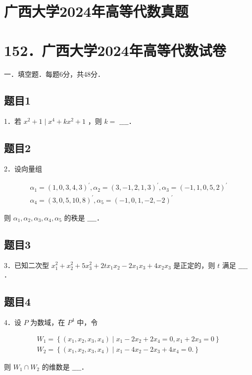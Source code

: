 \documentclass{article}
\begin{document}
\section*{广西大学2024年高等代数真题}
\section*{152．广西大学2024年高等代数试卷}
一．填空题．每题6分，共48分．\\

\subsection{题目1}
1．若 \(x^{2}+1 \mid x^{4}+k x^{2}+1\) ，则 \(k=\) \(\_\_\_\_\)．

\subsection{题目2}
2．设向量组

\[
\begin{gathered}
\alpha_{1}=(1,0,3,4,3)^{\prime}, \alpha_{2}=(3,-1,2,1,3)^{\prime}, \alpha_{3}=(-1,1,0,5,2)^{\prime} \\
\alpha_{4}=(3,0,5,10,8)^{\prime}, \alpha_{5}=(-1,0,1,-2,-2)^{\prime}
\end{gathered}
\]

则 \(\alpha_{1}, \alpha_{2}, \alpha_{3}, \alpha_{4}, \alpha_{5}\) 的秩是 \(\_\_\_\_\)．

\subsection{题目3}
3．已知二次型 \(x_{1}^{2}+x_{2}^{2}+5 x_{3}^{2}+2 t x_{1} x_{2}-2 x_{1} x_{3}+4 x_{2} x_{3}\) 是正定的，则 \(t\) 满足 \(\_\_\_\_\)．

\subsection{题目4}
4．设 \(P\) 为数域，在 \(P^{4}\) 中，令

\[
\begin{gathered}
W_{1}=\left\{\left(x_{1}, x_{2}, x_{3}, x_{4}\right) \mid x_{1}-2 x_{2}+2 x_{4}=0, x_{1}+2 x_{3}=0\right\} \\
W_{2}=\left\{\left(x_{1}, x_{2}, x_{3}, x_{4}\right) \mid x_{1}-4 x_{2}-2 x_{3}+4 x_{4}=0 .\right\}
\end{gathered}
\]

则 \(W_{1} \cap W_{2}\) 的维数是 \(\_\_\_\_\)．
\end{document}
